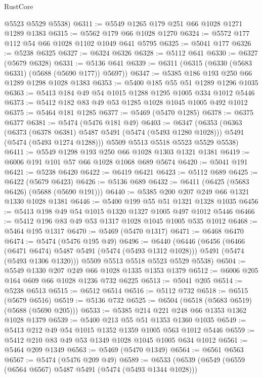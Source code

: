 \begin{lexlean}{RustCore}
\begin{coremodule}
      @5523
      @5529
      @5538)
@6311 := @5549 @1265 @179 @251 @66 @1028 @1271 @1289 @1383
@6315 := @5562 @179 @66 @1028 @1270
@6324 := @5572 @177 @112 @54 @66 @1028 @1102 @1049 @641 @5795
@6325 := @5041 @177
@6326 := @5238 @6325
@6327 := @6324 @6326
@6328 := @5112 @641
@6330 := @6327 (@5679 @6328)
@6331 := @5136 @641
@6339 := @6311 (@6315 (@6330 (@5683 @6331) (@5688 (@5690 @177)) @5697))
@6347 := @5385 @186 @193 @250 @66 @1289 @1298 @1028 @1383
@6353 := @5400 @185 @55 @51 @1289 @1296 @1035
@6363 := @5413 @184 @49 @54 @1015 @1288 @1295 @1005 @334 @1012 @5446
@6373 := @5412 @182 @83 @49 @53 @1285 @1028 @1045 @1005 @492 @1012
@6375 := @5464 @181 @1285
@6377 := @5469 (@5470 @1285)
@6378 := @6375 @6377
@6381 := @5474 (@5476 @181 @49)
@6403 := @6347
    (@6353
      (@6363
        (@6373 (@6378 @6381) @5487 @5491 (@5474 (@5493 @1280 @1028)))
        @5491
        (@5474 (@5493 @1274 @1288)))
      @5509
      @5513
      @5518
      @5523
      @5529
      @5538)
@6411 := @5549 @1298 @193 @250 @66 @1028 @1303 @1321 @1381
@6419 := @6006 @191 @101 @57 @66 @1028 @1068 @689 @5674
@6420 := @5041 @191
@6421 := @5238 @6420
@6422 := @6419 @6421
@6423 := @5112 @689
@6425 := @6422 (@5679 @6423)
@6426 := @5136 @689
@6432 := @6411 (@6425 (@5683 @6426) (@5688 (@5690 @191)))
@6440 := @5385 @200 @207 @249 @66 @1321 @1330 @1028 @1381
@6446 := @5400 @199 @55 @51 @1321 @1328 @1035
@6456 := @5413 @198 @49 @54 @1015 @1320 @1327 @1005 @497 @1012 @5446
@6466 := @5412 @196 @83 @49 @53 @1317 @1028 @1045 @1005 @535 @1012
@6468 := @5464 @195 @1317
@6470 := @5469 (@5470 @1317)
@6471 := @6468 @6470
@6474 := @5474 (@5476 @195 @49)
@6496 := @6440
    (@6446
      (@6456
        (@6466 (@6471 @6474) @5487 @5491 (@5474 (@5493 @1312 @1028)))
        @5491
        (@5474 (@5493 @1306 @1320)))
      @5509
      @5513
      @5518
      @5523
      @5529
      @5538)
@6504 := @5549 @1330 @207 @249 @66 @1028 @1335 @1353 @1379
@6512 := @6006 @205 @164 @609 @66 @1028 @1236 @732 @6225
@6513 := @5041 @205
@6514 := @5238 @6513
@6515 := @6512 @6514
@6516 := @5112 @732
@6518 := @6515 (@5679 @6516)
@6519 := @5136 @732
@6525 := @6504 (@6518 (@5683 @6519) (@5688 (@5690 @205)))
@6533 := @5385 @214 @221 @248 @66 @1353 @1362 @1028 @1379
@6539 := @5400 @213 @55 @51 @1353 @1360 @1035
@6549 := @5413 @212 @49 @54 @1015 @1352 @1359 @1005 @563 @1012 @5446
@6559 := @5412 @210 @83 @49 @53 @1349 @1028 @1045 @1005 @634 @1012
@6561 := @5464 @209 @1349
@6563 := @5469 (@5470 @1349)
@6564 := @6561 @6563
@6567 := @5474 (@5476 @209 @49)
@6589 := @6533
    (@6539
      (@6549
        (@6559 (@6564 @6567) @5487 @5491 (@5474 (@5493 @1344 @1028)))

\end{coremodule}
\end{lexlean}
